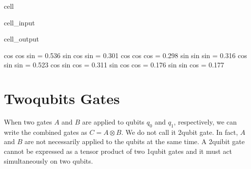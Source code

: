 \documentclass[letterpaper,10pt,english]{jupyterBook}
\begin{document}
\begin{sphinxuseclass}{cell}
\begin{sphinxVerbatimInput}
\begin{sphinxuseclass}{cell_input}
\begin{sphinxVerbatim}[commandchars=\\\{\}]
  

  

   
      \PYG{p}{[}\PYG{p}{]}
\end{sphinxVerbatim}

\end{sphinxuseclass}\end{sphinxVerbatimInput}
\begin{sphinxVerbatimOutput}

\begin{sphinxuseclass}{cell_output}
\begin{sphinxVerbatim}[commandchars=\\\{\}]
 cos cos sin  = 0.536
 sin cos sin  = 0.301
 cos cos cos  = 0.298
 sin sin sin  = 0.316
 cos sin sin  = 0.523
 cos sin cos  = 0.311
 sin cos cos  = 0.176
 sin sin cos  = 0.177
\end{sphinxVerbatim}

\end{sphinxuseclass}\end{sphinxVerbatimOutput}

\end{sphinxuseclass}
\sphinxstepscope


\chapter{Two\sphinxhyphen{}qubits Gates}
\label{\detokenize{q2gates/intro:two-qubits-gates}}\label{\detokenize{q2gates/intro::doc}}
\sphinxAtStartPar
When two gates \(A\) and \(B\) are applied to qubits \(q_0\) and \(q_1\), respectively, we can write the combined gates as \(C = A \otimes B\). We do not call it 2\sphinxhyphen{}qubit gate. In fact, \(A\) and \(B\) are not necessarily applied to the qubits at the same time.   A 2\sphinxhyphen{}quibit gate  cannot be expressed as a tensor product of two 1\sphinxhyphen{}qubit gates and it must act simultaneously on two qubits.
\end{document}
